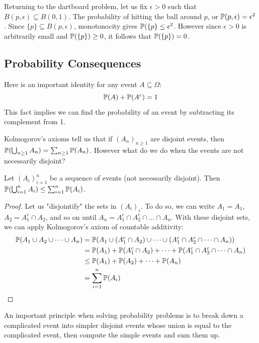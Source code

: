 Returning to the dartboard problem, let us fix $\epsilon > 0$ such that $B(p, \epsilon) \subseteq B(0,1)$. The probability of hitting the ball around $p$, or $\mathbb{P}(p, \epsilon) = \epsilon^2$. Since $\{p\} \subseteq B(p, \epsilon)$, monotonocity gives $\mathbb{P}(\{p\} \leq \epsilon^2$. However since $\epsilon > 0$ is arbitrarily small and $\mathbb{P}(\{p\}) \geq 0$, it follows that $\mathbb{P}(\{p\}) = 0$. 

\subsection{Probability Consequences}

Here is an important identity for any event $A \subseteq \Omega$:
\[ \mathbb{P}(A) + \mathbb{P}(A^c) = 1 \]
This fact implies we can find the probability of an event by subtracting its complement from 1. 

Kolmogorov's axioms tell us that if $(A_n)_{n \geq 1}$ are disjoint events, then $\mathbb{P}(\bigcup_{n \geq 1}A_n) = \sum_{n\geq1}\mathbb{P}(A_n)$. However what do we do when the events are not necessarily disjoint?

\begin{propbox}
   Let $(A_i)_{i = 1}^n $ be a sequence of events (not necessarily disjoint). Then $\mathbb{P}(\bigcup_{i = 1}^n A_i) \leq \sum_{i = 1}^n\mathbb{P}(A_i)$.
\end{propbox}

\begin{proof}
   Let us "disjointify" the sets in $(A_i)_i$. To do so, we can write $A_1 = A_1$, $A_2 = A_1^c \cap A_2$, and so on until $A_n = A_1^c \cap A_2^c \cap \dots \cap A_n$. With these disjoint sets, we can apply Kolmogorov's axiom of countable additivity:
   \begin{align*}
      \mathbb{P}(A_1 \cup A_2 \cup \dots \cup A_n) &= \mathbb{P}(A_1 \cup (A_1^c \cap A_2) \cup \dots \cup (A_1^c \cap A_2^c \cap \dots \cap A_n)) \\
                                            &= \mathbb{P}(A_1) + \mathbb{P}(A_1^c \cap A_2) + \dots + \mathbb{P}(A_1^c \cap A_2^c \cap \dots \cap A_n) \\
                                            &\leq \mathbb{P}(A_1) + \mathbb{P}(A_2) + \dots + \mathbb{P}(A_n) \\
                                            &=\sum_{i = 1}^{n}\mathbb{P}(A_i) \qedhere 
   \end{align*}
\end{proof}

An important principle when solving probability problems is to break down a complicated event into simpler disjoint events whose union is equal to the complicated event, then compute the simple events and sum them up.

